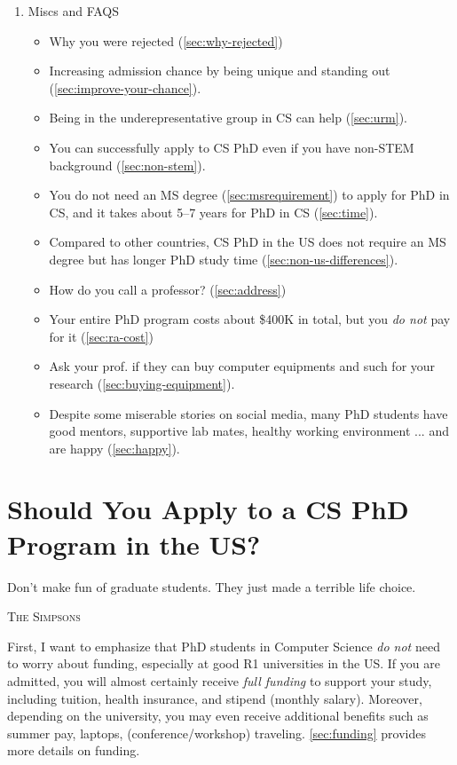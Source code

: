\documentclass[oneside,11pt,dvipsnames]{book}
\begin{document}
\begin{enumerate}
    \item Miscs and FAQS
        \begin{itemize}
          \item Why you were rejected (\autoref{sec:why-rejected})
          \item Increasing admission chance by being unique and standing out (\autoref{sec:improve-your-chance}).
          \item Being in the underepresentative group in CS can help (\autoref{sec:urm}).
          \item You can successfully apply to CS PhD even if you have non-STEM background (\autoref{sec:non-stem}).
          \item You do not need an MS degree (\autoref{sec:msrequirement}) to apply for PhD in CS, and it takes about 5--7 years for PhD in CS (\autoref{sec:time}).
          \item Compared to other countries, CS PhD in the US does not require an MS degree but has longer PhD study time (\autoref{sec:non-us-differences}).
          \item How do you call a professor? (\autoref{sec:address})
          \item Your entire PhD program costs about \$400K in total, but you \emph{do not} pay for it (\autoref{sec:ra-cost})
          \item Ask your prof. if they can buy computer equipments and such for your research (\autoref{sec:buying-equipment}).
          \item Despite some miserable stories on social media, many PhD students have good mentors, supportive lab mates, healthy working environment ... and are happy (\autoref{sec:happy}).
        \end{itemize}
\end{enumerate}


\mainmatter
\chapter{Should You Apply to a CS PhD Program in the US?}\label{sec:should}

\epigraph{\vspace{-0.2in} Don't make fun of graduate students. They just made a terrible life choice.}{\textsc{The Simpsons}}

First, I want to emphasize that PhD students in Computer Science \emph{do not} need to worry about funding, especially at good R1
universities in the US. If you are admitted, you will almost certainly
receive \emph{full funding} to support your study, including tuition,
health insurance, and stipend (monthly salary). Moreover, depending on the university,
you may even receive additional benefits such as summer pay, laptops, (conference/workshop) traveling. \autoref{sec:funding} provides more details on funding.
\end{document}
